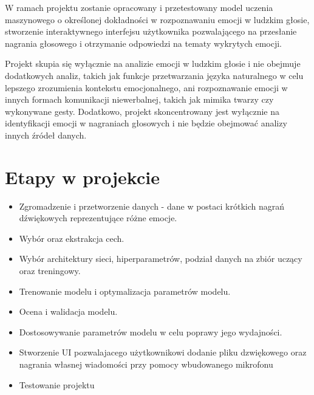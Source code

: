 \documentclass[12pt,titlepage]{article}
\begin{document}
W ramach projektu zostanie opracowany i przetestowany model uczenia maszynowego o określonej dokładności w rozpoznawaniu emocji w ludzkim głosie, stworzenie interaktywnego interfejsu użytkownika pozwalającego na przesłanie nagrania głosowego i otrzymanie odpowiedzi na tematy wykrytych emocji.

Projekt skupia się wyłącznie na analizie emocji w ludzkim głosie i nie obejmuje dodatkowych analiz, takich jak funkcje przetwarzania języka naturalnego w celu lepszego zrozumienia kontekstu emocjonalnego, ani rozpoznawanie emocji w innych formach komunikacji niewerbalnej, takich jak mimika twarzy czy wykonywane gesty. Dodatkowo, projekt skoncentrowany jest wyłącznie na identyfikacji emocji w nagraniach głosowych i nie będzie obejmować analizy innych źródeł danych.

\section{Etapy w projekcie}
\begin{itemize}
    \item Zgromadzenie i przetworzenie danych - dane w postaci krótkich nagrań dźwiękowych reprezentujące różne emocje.
    \item Wybór oraz ekstrakcja cech.
    \item Wybór architektury sieci, hiperparametrów, podział danych na zbiór uczący oraz treningowy.
    \item Trenowanie modelu i optymalizacja parametrów modelu.
    \item Ocena i walidacja modelu.
    \item Dostosowywanie parametrów modelu w celu poprawy jego wydajności.
    \item Stworzenie UI pozwalajacego użytkownikowi dodanie pliku dzwiękowego oraz nagrania własnej wiadomości przy pomocy wbudowanego mikrofonu
    \item Testowanie projektu
\end{itemize}
\end{document}
